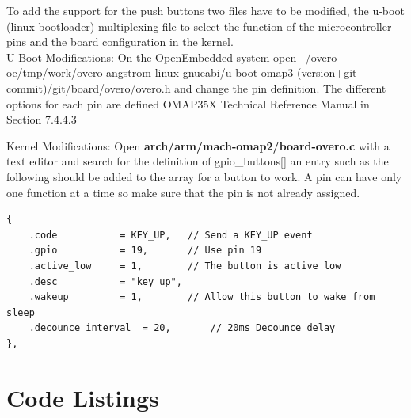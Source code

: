 \documentclass[11pt]{report} %
\begin{document}
		To add the support for the push buttons two files have to be modified,
		the u-boot (linux bootloader) multiplexing file to select the function
		of the microcontroller pins and the board configuration in the kernel.\\

		U-Boot Modifications: On the OpenEmbedded system open
		~/overo-oe/tmp/work/overo-angstrom-linux-gnueabi/u-boot-omap3-(version+git-commit)/git/board/overo/overo.h and change the pin definition. The different options for 
		each pin are defined OMAP35X Technical Reference Manual in Section 7.4.4.3

		Kernel Modifications: Open {\bf arch/arm/mach-omap2/board-overo.c} with
		a text editor and search for the definition of gpio\_buttons[]
		an entry such as the following should be added to the array for a
		button to work. A pin can have only one function at a time so make sure
		that the pin is not already assigned.

\begin{lstlisting}
{
	.code			= KEY_UP,	// Send a KEY_UP event
	.gpio			= 19,		// Use pin 19
	.active_low		= 1,		// The button is active low
	.desc			= "key up",	
	.wakeup			= 1,		// Allow this button to wake from sleep
	.decounce_interval	= 20,		// 20ms Decounce delay
},
\end{lstlisting}

\chapter{Code Listings}
\end{document}

